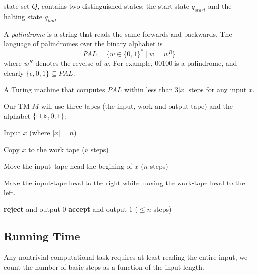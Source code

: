 state set $Q$, contains two distinguished states: 
the start state $q_{start}$ and the halting state $q_{halt}$







\begin{example}[palindrome \zh{回文}]
    A \textit{palindrome} is a string that reads the same forwards and backwards. 
    The language of palindromes over the binary alphabet is 
    \[
        PAL = \{ w \in \{0,1\}^* \mid w = w^R \}
    \]
    where $w^R$ denotes the reverse of $w$.
    For example, 
    $00100$ is a palindrome,
    and clearly $\{\epsilon,0,1\} \subseteq PAL$.
    
    A Turing machine that computes $PAL$ within less than $3|x|$ steps for any input $x$.

    Our TM $M$ will use three tapes (the input, work and output tape) and the alphabet $\{\sqcup,\triangleright,0,1\}$: 
    
    \vspace{1em}
    \begin{algorithmic}[1]
        \State Input $x$  (where $|x|=n$)

        \State 
        Copy $x$ to the work tape \qquad ($n$ steps)

        \State 
        Move the input--tape head the begining of $x$ \qquad ($n$ steps)

        \State 
        Move the input-tape head to the right while moving the work-tape head to the left.

            \State \textbf{reject} and output $0$
        \Else 
            \State \textbf{accept} and output $1$
        \EndIf  \qquad ($\leq n$ steps)
        \end{algorithmic}
\end{example}




\subsection{Running Time}

Any nontrivial computational task requires at least reading the entire input, 
we count the number of basic steps as a function of the input length.



